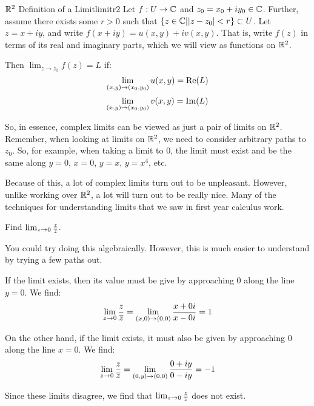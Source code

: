 \begin{defbo}{$\mathbb{R}^2$ Definition of a Limit}{limitr2}
Let $f:U\rightarrow \mathbb{C}$ and $z_0 = x_0 + iy_0 \in \mathbb{C}$. Further, assume there exists some $r > 0$ such that $\{z\in \mathbb{C}| |z-z_0| < r\} \subset U$. Let $z = x+ iy$, and write $f(x + iy) = u(x,y) + iv(x,y)$. That is, write $f(z)$ in terms of its real and imaginary parts, which we will view as functions on $\mathbb{R}^2$.

Then $\lim_{z\rightarrow z_0} f(z) = L$ if:
$$\lim_{(x,y)\rightarrow (x_0,y_0)} u(x,y) = \operatorname{Re}(L)$$
$$\lim_{(x,y)\rightarrow (x_0,y_0)} v(x,y) = \operatorname{Im}(L)$$
\end{defbo}

So, in essence, complex limits can be viewed as just a pair of limits on $\mathbb{R}^2$. Remember, when looking at limits on $\mathbb{R}^2$, we need to consider arbitrary paths to $z_0$. So, for example, when taking a limit to $0$, the limit must exist and be the same along $y = 0$, $x = 0$, $y = x$, $y = x^4$, etc. 

Because of this, a lot of complex limits turn out to be unpleasant. However, unlike working over $\mathbb{R}^2$, a lot will turn out to be really nice. Many of the techniques for understanding limits that we saw in first year calculus work.

\begin{ex}{}{} Find $\lim_{z\rightarrow 0} \frac{z}{\overline{z}}$.

You could try doing this algebraically. However, this is much easier to understand by trying a few paths out.

If the limit exists, then its value must be give by approaching $0$ along the line $y = 0$. We find:
$$\lim_{z\rightarrow 0} \frac{z}{\overline{z}} = \lim_{(x,0) \rightarrow (0,0)} \frac{x + 0i}{x-0i} = 1$$

On the other hand, if the limit exists, it must also be given by approaching $0$ along the line $x = 0$. We find:
$$\lim_{z\rightarrow 0} \frac{z}{\overline{z}} = \lim_{(0,y) \rightarrow (0,0)} \frac{0 + iy}{0 - iy} = -1$$
	
Since these limits disagree, we find that $\lim_{z\rightarrow 0} \frac{z}{\overline{z}}$ does not exist.
\end{ex}

